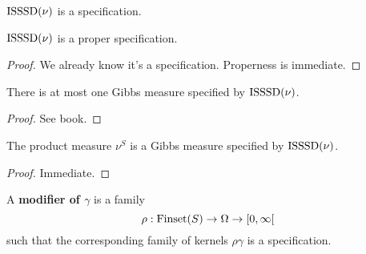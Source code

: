 \begin{definition}
    \label{def:isssd-spec}
    \leanok

    $\operatorname{ISSSD}(\nu)$ is a specification.
\end{definition}

\begin{lemma}
    \label{lem:isssd-proper-spec}
    \leanok

    $\operatorname{ISSSD}(\nu)$ is a proper specification.
\end{lemma}
\begin{proof}

    We already know it's a specification. Properness is immediate.
\end{proof}

\begin{lemma}
    \label{lem:isssd-gibbs-meas-uniqueness}

    There is at most one Gibbs measure specified by $\operatorname{ISSSD}(\nu)$.
\end{lemma}
\begin{proof}

    See book.
\end{proof}

\begin{lemma}
    \label{lem:isssd-gibbs-meas-existence}

    The product measure $\nu^S$ is a Gibbs measure specified by $\operatorname{ISSSD}(\nu)$.
\end{lemma}
\begin{proof}

   Immediate.
\end{proof}

\begin{definition}[Modifier]
    \label{def:modif}
    \leanok

    A {\bf modifier of $\gamma$} is a family
    $$\rho : \operatorname{Finset}(S) \to \Omega \to [0, \infty[$$
    such that the corresponding family of kernels $\rho\gamma$ is a specification.
\end{definition}

